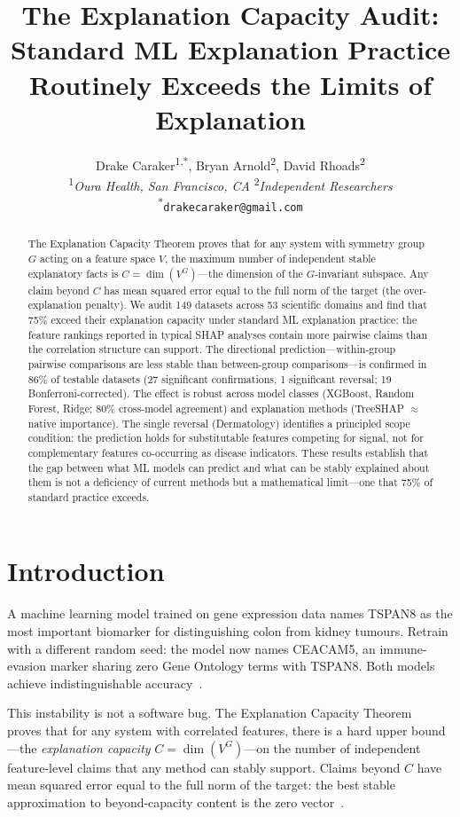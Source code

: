 \documentclass[11pt]{article}
\title{\Large\textbf{The Explanation Capacity Audit:\\Standard ML Explanation Practice\\Routinely Exceeds the Limits of Explanation}}
\author{%
  Drake Caraker\textsuperscript{1,*},
  Bryan Arnold\textsuperscript{2},
  David Rhoads\textsuperscript{2}
  \\[4pt]
  \textsuperscript{1}\textit{Oura Health, San Francisco, CA}
  \quad
  \textsuperscript{2}\textit{Independent Researchers}
  \\[2pt]
  \textsuperscript{*}\texttt{drakecaraker@gmail.com}
}
\date{}
\begin{document}
\maketitle

\begin{abstract}
The Explanation Capacity Theorem proves that for any system with symmetry
group $G$ acting on a feature space $V$, the maximum number of independent
stable explanatory facts is $C = \dim(V^G)$---the dimension of the
$G$-invariant subspace.  Any claim beyond $C$ has mean squared error equal
to the full norm of the target (the over-explanation penalty).  We audit 149
datasets across 53 scientific domains and find that 75\% exceed their
explanation capacity under standard ML explanation practice: the feature
rankings reported in typical SHAP analyses contain more pairwise claims
than the correlation structure can support.  The directional prediction---within-group
pairwise comparisons are less stable than between-group comparisons---is
confirmed in 86\% of testable datasets (27 significant confirmations,
1 significant reversal; 19 Bonferroni-corrected).  The effect is robust
across model classes (XGBoost, Random Forest, Ridge; 80\% cross-model
agreement) and explanation methods (TreeSHAP $\approx$ native importance).
The single reversal (Dermatology) identifies a principled scope condition:
the prediction holds for substitutable features competing for signal, not
for complementary features co-occurring as disease indicators.  These
results establish that the gap between what ML models can predict and what
can be stably explained about them is not a deficiency of current methods
but a mathematical limit---one that 75\% of standard practice exceeds.
\end{abstract}

\section{Introduction}

A machine learning model trained on gene expression data names TSPAN8 as
the most important biomarker for distinguishing colon from kidney tumours.
Retrain with a different random seed: the model now names CEACAM5, an
immune-evasion marker sharing zero Gene Ontology terms with TSPAN8.  Both
models achieve indistinguishable accuracy~\citep{caraker2026limits}.

This instability is not a software bug.  The Explanation Capacity
Theorem~\citep{caraker2026limits} proves that for any system with
correlated features, there is a hard upper bound---the \emph{explanation
capacity} $C = \dim(V^G)$---on the number of independent feature-level
claims that any method can stably support.  Claims beyond $C$ have mean
squared error equal to the full norm of the target: the best stable
approximation to beyond-capacity content is the zero
vector~\citep{caraker2026limits}.
\end{document}
